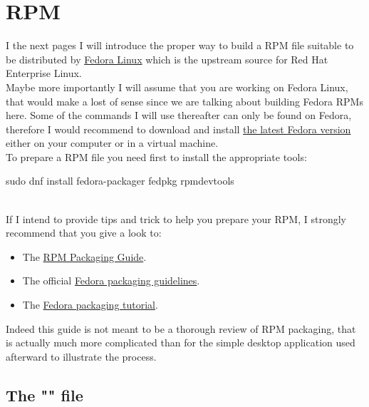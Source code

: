 \section{RPM}

I the next pages I will introduce the proper way to build a RPM file suitable to be distributed by \href{https://www.fedora.org}{Fedora Linux} 
which is the upstream source for Red Hat Enterprise Linux. \\[0.25cm]
Maybe more importantly I will assume that you are working on Fedora Linux, 
that would make a lost of sense since we are talking about building Fedora RPMs here. 
Some of the commands I will use thereafter can only be found on Fedora, 
therefore I would recommend to download and install \href{https://getfedora.org/fr/workstation/download/}{the latest Fedora version} either on your computer or in a virtual machine. \\[0.5cm]
To prepare a RPM file you need first to install the appropriate tools: 
\begin{script}
\fprompt{~} sudo dnf install fedora-packager fedpkg rpmdevtools
\end{script}
\\[-0.5cm]
\noindent If I intend to provide tips and trick to help you prepare your RPM, I strongly recommend that you give a look to:
\begin{itemize}
\item The \href{https://rpm-packaging-guide.github.io/}{RPM Packaging Guide}.
\item The official \href{https://docs.fedoraproject.org/en-US/packaging-guidelines/}{Fedora packaging guidelines}. 
\item The \href{https://docs.fedoraproject.org/en-US/packaging-guidelines/}{Fedora packaging tutorial}.
\end{itemize}
Indeed this guide is not meant to be a thorough review of RPM packaging,  
that is actually much more complicated than for the simple desktop application used afterward to illustrate the process. 

\subsection{The "" file}

